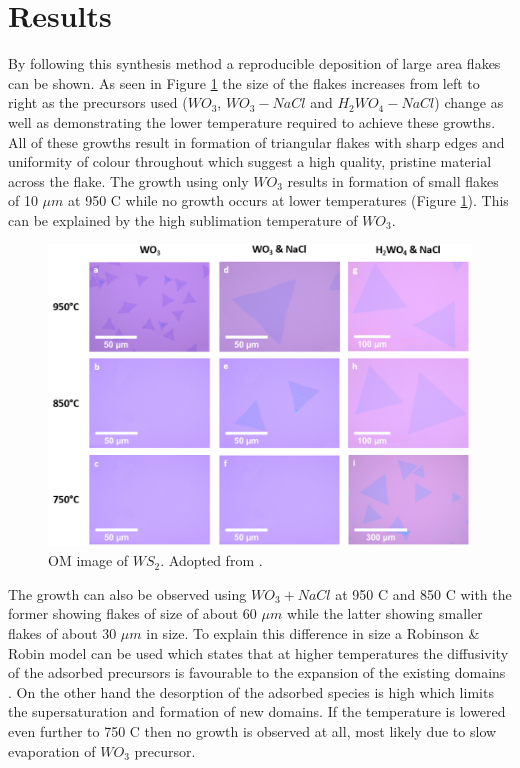 \section{Results}

By following this synthesis method a reproducible deposition of large area flakes can be shown. As seen in Figure \ref{fig:PaperOptical} the size of the flakes increases from left to right as the precursors used ($WO_3$, $WO_3-NaCl$ and $H_2WO_4-NaCl$) change as well as demonstrating the lower temperature required to achieve these growths. All of these growths result in formation of triangular flakes with sharp edges and uniformity of colour throughout which suggest a high quality, pristine material across the flake. 
The growth using only $WO_3$ results in formation of small flakes of 10 $\mu m$ at 950 {\degree}C while no growth occurs at lower temperatures (Figure \ref{fig:PaperOptical}). This can be explained by the high sublimation temperature of $WO_3$.

\begin{figure}[H]
	\begin{center}
		\includegraphics[scale=0.3]{PaperOptical.png}
		\caption{OM image of $WS_2$. Adopted from \cite{Reale2017}.}
		\label{fig:PaperOptical}
	\end{center}
\end{figure}

The growth can also be observed using $WO_3 + NaCl$ at 950 {\degree}C and 850 {\degree}C with the former showing flakes of size of about 60 $\mu m$ while the latter showing smaller flakes of about 30 $\mu m$ in size. To explain this difference in size a Robinson \& Robin model can be used which states that at higher temperatures the diffusivity of the adsorbed precursors is favourable to the expansion of the existing domains \cite{Kim2012}. On the other hand the desorption of the adsorbed species is high which limits the supersaturation and formation of new domains. If the temperature is lowered even further to 750 {\degree}C then no growth is observed at all, most likely due to slow evaporation of $WO_3$ precursor. 

